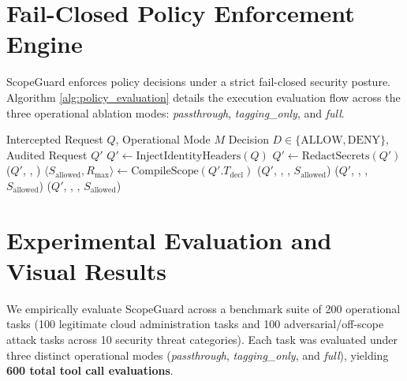 \documentclass[conference]{IEEEtran}
\begin{document}
\section{Fail-Closed Policy Enforcement Engine}\label{sec:policy_engine}

ScopeGuard enforces policy decisions under a strict fail-closed security posture. Algorithm \ref{alg:policy_evaluation} details the execution evaluation flow across the three operational ablation modes: \textit{passthrough}, \textit{tagging\_only}, and \textit{full}.

\begin{algorithm}[t]
\caption{ScopeGuard Fail-Closed Policy Evaluation}
\label{alg:policy_evaluation}
\begin{algorithmic}[1]
\REQUIRE Intercepted Request $Q$, Operational Mode $M$
\ENSURE Decision $D \in \{\text{ALLOW}, \text{DENY}\}$, Audited Request $Q'$
\STATE $Q' \leftarrow \text{InjectIdentityHeaders}(Q)$
\STATE $Q' \leftarrow \text{RedactSecrets}(Q')$
    \STATE {}($Q'$, , )
    \RETURN {}
\ENDIF
\STATE $\langle S_{\text{allowed}}, R_{\text{max}} \rangle \leftarrow \text{CompileScope}(Q'.T_{\text{decl}})$
    \STATE {}($Q'$, , , $S_{\text{allowed}}$)
    \RETURN {}
\ENDIF
{}
    \STATE {}($Q'$, , , $S_{\text{allowed}}$)
    \RETURN {}
\ELSE
    \STATE {}($Q'$, , , $S_{\text{allowed}}$)
    \RETURN {}
\ENDIF
\end{algorithmic}
\end{algorithm}

\section{Experimental Evaluation and Visual Results}\label{sec:evaluation}

We empirically evaluate ScopeGuard across a benchmark suite of 200 operational tasks (100 legitimate cloud administration tasks and 100 adversarial/off-scope attack tasks across 10 security threat categories). Each task was evaluated under three distinct operational modes (\textit{passthrough}, \textit{tagging\_only}, and \textit{full}), yielding \textbf{600 total tool call evaluations}.
\end{document}
